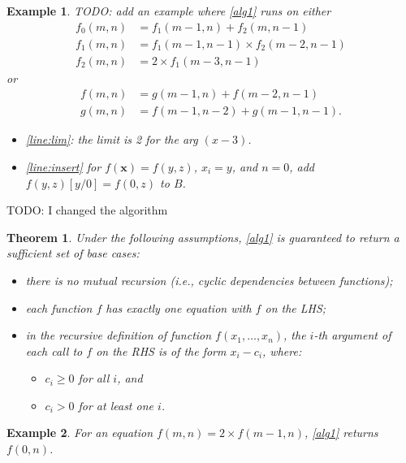 \documentclass{article}
\newtheorem{example}{Example}
\newtheorem{theorem}{Theorem}
\begin{document}
\begin{example}
  TODO: add an example where \cref{alg1} runs on either
  \begin{align*}
    f_{0}(m, n) &= f_{1}(m-1, n) + f_{2}(m, n-1)\\
    f_{1}(m, n) &= f_{1}(m-1, n-1) \times f_{2}(m-2, n-1)\\
    f_{2}(m, n) &= 2 \times f_{1}(m-3, n-1)
  \end{align*}
  or
  \begin{align*}
    f(m, n) &= g(m-1, n) + f(m-2, n-1)\\
    g(m, n) &= f(m-1, n-2) + g(m-1, n-1).
  \end{align*}

  \begin{itemize}
    \item \cref{line:lim}: the limit is 2 for the arg $(x-3)$.
    \item \cref{line:insert} for $f(\mathbf{x}) = f(y, z)$, $x_{i} = y$, and
          $n = 0$, add $f(y, z)[y/0] = f(0, z)$ to $B$.
  \end{itemize}
\end{example}

TODO: I changed the algorithm

\begin{theorem}
  Under the following assumptions, \cref{alg1} is guaranteed to return a
  sufficient set of base cases:
  \begin{itemize}
    \item there is no mutual recursion (i.e., cyclic dependencies between
          functions);
    \item each function $f$ has exactly one equation with $f$ on the LHS;
    \item in the recursive definition of function $f(x_{1},\dots,x_{n})$, the
          $i$-th argument of each call to $f$ on the RHS is of the form
          $x_{i} - c_{i}$, where:
          \begin{itemize}
            \item $c_{i} \ge 0$ for all $i$, and
            \item $c_{i} > 0$ for at least one $i$.
          \end{itemize}
  \end{itemize}
\end{theorem}

\begin{example}
  For an equation $f(m, n) = 2 \times f(m-1, n)$, \cref{alg1} returns $f(0, n)$.
\end{example}
\end{document}
